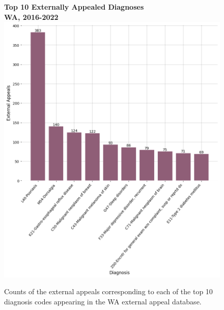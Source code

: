 \documentclass[12pt, a4paper,twoside,parskip=full]{report}
\theoremstyle{plain} %
\theoremstyle{definition} %
\theoremstyle{remark} %
\numberwithin{equation}{chapter}
\begin{document}
		\begin{figure}[h!]
			\centering
			\textbf{Top 10 Externally Appealed Diagnoses}\\ 
			\textbf{WA, 2016-2022}\\
			\includegraphics[width=.8\textwidth]{images/wa_external_appeals/top_externally_appealed_diagnoses.png}
			\caption{Counts of the external appeals corresponding to each of the top 10 diagnosis codes appearing in the WA external appeal database.}
			\label{waexternalappealsbydiagnosis}
		\end{figure}
	\clearpage
		
\end{document}

